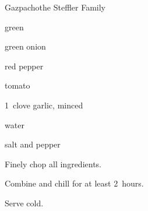 \begin{recipe}{Gazpacho}{the Steffler Family}{}

\begin{ingredients}
\item {} 
\item {} green 
\item {} 
\item \C{\quarter} green onion
\item \C{} red pepper
\item {} 
\item {} tomato
\item 1~clove garlic, minced
\item {} water
\item salt and pepper
\end{ingredients}

\begin{directions}
\item Finely chop all ingredients.
\item Combine and chill for at least 2~hours.
\item Serve cold.
\end{directions}
\end{recipe}
